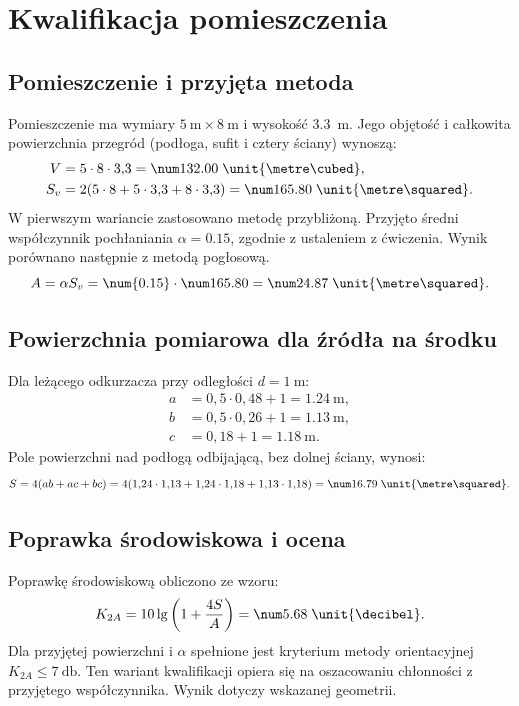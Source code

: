 \section{Kwalifikacja pomieszczenia}
\subsection{Pomieszczenie i przyjęta metoda}
Pomieszczenie ma wymiary $\qty{5}{\metre}\times\qty{8}{\metre}$
i wysokość \qty{3.3}{\metre}. Jego objętość i całkowita powierzchnia
przegród (podłoga, sufit i cztery ściany) wynoszą:
\begin{align}
V &= 5\cdot8\cdot3{,}3 = \roomVolume\;\unit{\metre\cubed},\\
S_v &= 2(5\cdot8+5\cdot3{,}3+8\cdot3{,}3)
= \roomSurface\;\unit{\metre\squared}.
\end{align}
W pierwszym wariancie zastosowano metodę przybliżoną.
Przyjęto średni współczynnik pochłaniania $\alpha=\num{0.15}$, zgodnie
z ustaleniem z ćwiczenia. Wynik porównano następnie z metodą pogłosową.
\begin{equation}
A=\alpha S_v=\num{0.15}\cdot\roomSurface
=\roomAbsorption\;\unit{\metre\squared}.
\end{equation}
\subsection{Powierzchnia pomiarowa dla źródła na środku}
Dla leżącego odkurzacza przy odległości $d=\qty{1}{\metre}$:
\begin{align}
a&=0{,}5\cdot0{,}48+1=\qty{1.24}{\metre},\\
b&=0{,}5\cdot0{,}26+1=\qty{1.13}{\metre},\\
c&=0{,}18+1=\qty{1.18}{\metre}.
\end{align}
Pole powierzchni nad podłogą odbijającą, bez dolnej ściany, wynosi:
\begin{equation}
S=4(ab+ac+bc)
=4(1{,}24\cdot1{,}13+1{,}24\cdot1{,}18+1{,}13\cdot1{,}18)
=\measurementSurface\;\unit{\metre\squared}.
\end{equation}
\subsection{Poprawka środowiskowa i ocena}
Poprawkę środowiskową obliczono ze wzoru:
\begin{equation}
K_{2A}=10\lg\left(1+\frac{4S}{A}\right)
=\environmentCorrection\;\unit{\decibel}.
\end{equation}
Dla przyjętej powierzchni i $\alpha$ spełnione jest kryterium metody
orientacyjnej $K_{2A}\leq\qty{7}{\decibel}$.
Ten wariant kwalifikacji opiera się na oszacowaniu chłonności z przyjętego współczynnika.
Wynik dotyczy wskazanej geometrii.

